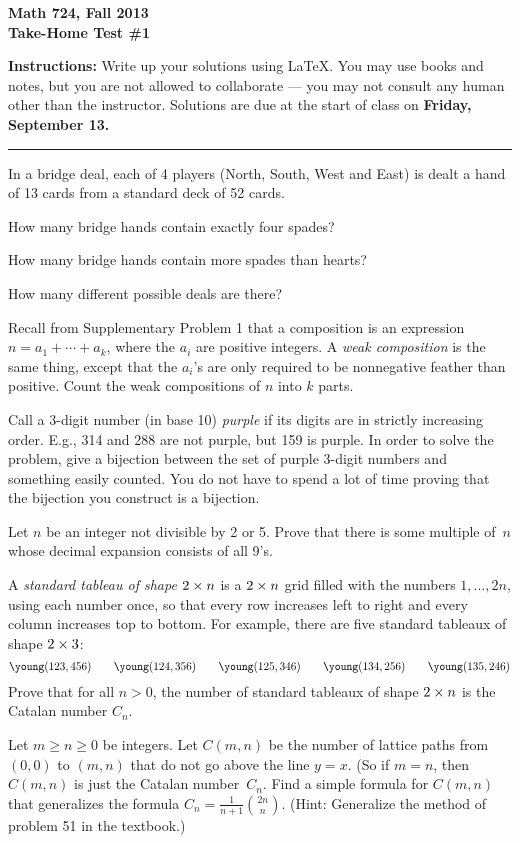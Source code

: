 

\thispagestyle{empty}

\bf Math 724, Fall 2013\\
Take-Home Test \#1\rm

{\bf Instructions:} Write up your solutions using LaTeX.
You may use books and notes, but you are not allowed to collaborate ---
you may not consult any human other than the instructor.
Solutions are due at the start of class on {\bf Friday, September 13.}
\medskip\hrule\bigskip

\prob
In a bridge deal, each of 4 players (North, South, West and East) is dealt a hand of 13 cards from a standard deck of 52 cards.  

How many bridge hands contain exactly four spades?

How many bridge hands contain more spades than hearts?

How many different possible deals are there?

Recall from Supplementary Problem 1 that a composition is an expression $n=a_1+\cdots+a_k$,
where the $a_i$ are positive integers.  A \emph{weak composition}
is the same thing, except that the $a_i$'s are only required to be
nonnegative feather than positive.
Count the weak compositions of $n$ into $k$ parts.

Call a 3-digit number (in base 10) \emph{purple} if its digits are in strictly increasing order.  E.g., 314 and 288 are not purple, but 159 is purple.  In order to solve the problem, give a bijection between the set of purple 3-digit numbers and something easily counted.  You do not have to spend a lot of time proving that the bijection you construct is a bijection.

Let $n$ be an integer not divisible by 2 or 5.  Prove that there is some
multiple of~$n$ whose decimal expansion consists of all 9's.

A \emph{standard tableau of shape $2\times n$} is a $2\times n$ grid filled with the numbers
$1,\dots,2n$, using each number once, so that every row increases left to right and every column increases top to bottom.  For example, there are five standard tableaux of shape $2\times3$:
\[\young(123,456)\qquad
\young(124,356)\qquad
\young(125,346)\qquad
\young(134,256)\qquad
\young(135,246)\]
Prove that for all $n>0$, the number of standard tableaux of shape $2\times n$
is the Catalan number $C_n$.

Let $m\geq n\geq 0$ be integers.  Let $C(m,n)$ be the number of lattice
paths from $(0,0)$ to $(m,n)$ that do not go above the line $y=x$.  (So if $m=n$, then $C(m,n)$ is just the Catalan number~$C_n$.  Find a simple formula for $C(m,n)$ that generalizes the formula $C_n=\frac{1}{n+1}\binom{2n}{n}$.  (Hint: Generalize the method of problem 51 in the textbook.)


